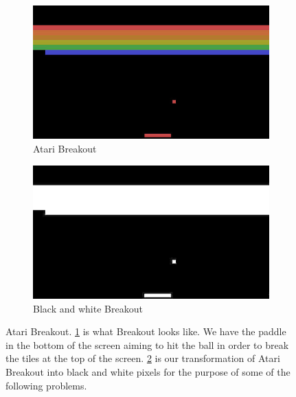 \documentclass[11pt,addpoints,answers]{exam}
\begin{document}
\begin{questions}
\begin{figure}[H]
    \centering
    \begin{subfigure}{0.5\textwidth}
        \includegraphics[width=0.99\linewidth]{figs/atari_crop_color.png}
        \caption{Atari Breakout}
        \label{fig:breakout}
    \end{subfigure}%
    \begin{subfigure}{0.5\textwidth}
        \includegraphics[width=0.99\linewidth]{figs/atari_crop_bw.png}
        \caption{Black and white Breakout}
        \label{fig:bw_breakout}
    \end{subfigure}
    \caption{Atari Breakout. \ref{fig:breakout} is what Breakout looks like. We have the paddle in the bottom of the screen aiming to hit the ball in order to break the tiles at the top of the screen. \ref{fig:bw_breakout} is our transformation of Atari Breakout into black and white pixels for the purpose of some of the following problems.}
    \label{fig:my_label}
\end{figure}

\end{questions}
\end{document}
